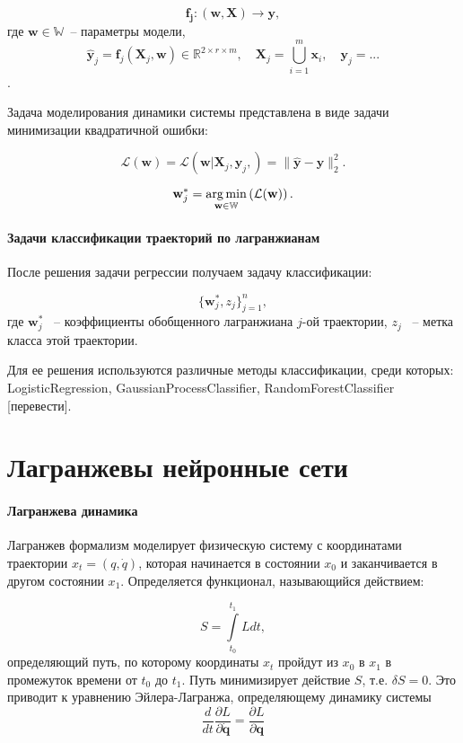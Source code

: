 \documentclass[12pt, twoside]{article}
\begin{document}
    $$\mathbf{f_j} \colon (\mathbf{w}, \mathbf{X}) \to \mathbf{y},$$ 
    где $\mathbf{w} \in \mathbb{W}$~-- параметры модели, 
    $$\hat{\mathbf{y}}_j = \mathbf{f} _j(\mathbf{X}_j,\mathbf{w}) \in \mathbb{R}^{2\times r \times m}, \quad \mathbf{X}_j = \bigcup_{i=1}^m \mathbf{x}_i, \quad \mathbf{y}_j = ... $$. 

    Задача моделирования динамики системы представлена в виде задачи минимизации квадратичной ошибки: 

    $$\mathcal{L}(\textbf{w}) = \mathcal{L}( \mathbf{w} | \mathbf{X}_j, \mathbf{y}_j, ) = \| \hat{\mathbf{y}} - \mathbf{y} \|_2^2.$$



    $$\textbf{w}_j^* = \argmin_{\mathbf{w}\in\mathbb{W} }\left(\mathcal{L}(\textbf{w})\right).$$

\paragraph{Задачи классификации траекторий по лагранжианам}

    После решения задачи регрессии получаем задачу классификации:

    $$\{\textbf{w}^*_j, z_j\}_{j=1}^n,$$
    где $\textbf{w}^*_j$ ~-- коэффициенты обобщенного лагранжиана $j$-ой траектории, $z_j$ ~-- метка класса этой траектории.

    Для ее решения используются различные методы классификации, среди которых: LogisticRegression, GaussianProcessClassifier, RandomForestClassifier [перевести].

\section{Лагранжевы нейронные сети}

\paragraph{Лагранжева динамика}		

Лагранжев формализм \cite{cranmer2020lagrangian, goldstein:mechanics, class_mechanics, arnold_mechanics} моделирует физическую систему с координатами траектории $x_t = (q, \dot{q})$, которая начинается в состоянии $x_0$ и заканчивается в другом состоянии $x_1$. Определяется функционал, называющийся действием:

$$S=\int\limits_{t_{0}}^{t_{1}} L d t,$$
определяющий путь, по которому координаты $x_t$ пройдут из $x_0$ в $x_1$ в промежуток времени от $t_0$ до $t_1$. Путь минимизирует действие $S$, т.е. $\delta S = 0$. Это приводит к уравнению Эйлера-Лагранжа, определяющему динамику системы
$$\frac{d}{d t} \frac{\partial L}{\partial \dot{\mathbf{q}}}=\frac{\partial L}{\partial \mathbf{q}}$$
\end{document}
